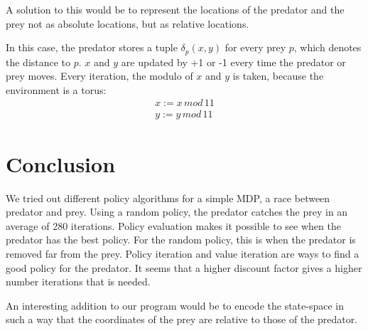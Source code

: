 \documentclass{article}
\begin{document}
A solution to this would be to represent the locations of the predator and the prey not as absolute locations, but as relative locations.

In this case, the predator stores a tuple $\delta_{p}(x,y)$ for every prey $p$, which denotes the distance to $p$. $x$ and $y$ are updated by +1 or -1 every time the predator or prey moves. Every iteration, the modulo of $x$ and $y$ is taken, because the environment is a torus:
\begin{align}
x := x\,mod\,11\\
y := y\,mod\,11
\end{align}

\section{Conclusion}
We tried out different policy algorithms for a simple MDP, a race between predator and prey. Using a random policy, the predator catches the prey in an average of 280 iterations. Policy evaluation makes it possible to see when the predator has the best policy. For the random policy, this is when the predator is removed far from the prey. Policy iteration and value iteration are ways to find a good policy for the predator. It seems that a higher discount factor gives a higher number iterations that is needed.

An interesting addition to our program would be to encode the state-space in such a way that the coordinates of the prey are relative to those of the predator. 
\end{document}
